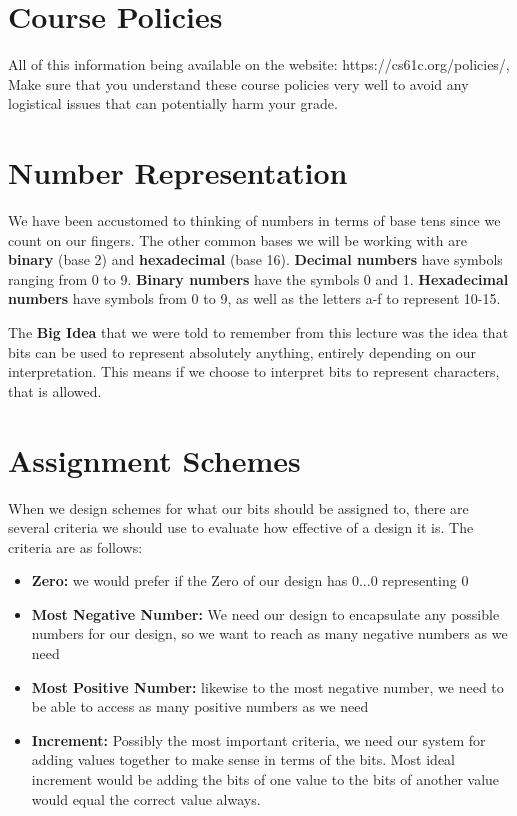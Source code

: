 \documentclass[letterpaper]{article}
\theoremstyle{remark}
\begin{document}
\section{Course Policies}
All of this information being available on the website: 
https://cs61c.org/policies/, 
Make sure that you understand these course policies very well to avoid any logistical issues that can potentially harm your grade.

\section{Number Representation}
We have been accustomed to thinking of numbers in terms of base tens since we count on our fingers. The other common bases we will be working with are \textbf{binary} (base 2) and \textbf{hexadecimal} (base 16). \textbf{Decimal numbers} have symbols ranging from 0 to 9. \textbf{Binary numbers} have the symbols 0 and 1. \textbf{Hexadecimal numbers} have symbols from 0 to 9, as well as the letters a-f to represent 10-15.

The \textbf{Big Idea} that we were told to remember from this lecture was the idea that bits can be used to represent absolutely anything, entirely depending on our interpretation. This means if we choose to interpret bits to represent characters, that is allowed.

\section{Assignment Schemes}
When we design schemes for what our bits should be assigned to, there are several criteria we should use to evaluate how effective of a design it is. The criteria are as follows:
\begin{itemize}
    \item \textbf{Zero:} we would prefer if the Zero of our design has 0...0 representing 0
    \item \textbf{Most Negative Number:} We need our design to encapsulate any possible numbers for our design, so we want to reach as many negative numbers as we need
    \item \textbf{Most Positive Number:} likewise to the most negative number, we need to be able to access as many positive numbers as we need
    \item \textbf{Increment:} Possibly the most important criteria, we need our system for adding values together to make sense in terms of the bits. Most ideal increment would be adding the bits of one value to the bits of another value would equal the correct value always.
\end{itemize}
\end{document}
